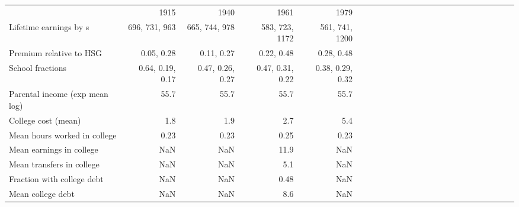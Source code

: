 \begin{tabular}{lrrrrrrrrrrrrrrrrrrrrrrr}
\hline
 & 1915  & 1940  & 1961  & 1979  &   &   &   &   &   &   &   &   &   &   &   &   &   &   &   &   &   &   &   \\
Lifetime earnings by s & 696, 731, 963  & 665, 744, 978  & 583, 723, 1172  & 561, 741, 1200  &   &   &   &   &   &   &   &   &   &   &   &   &   &   &   &   &   &   &   \\
Premium relative to HSG & 0.05, 0.28  & 0.11, 0.27  & 0.22, 0.48  & 0.28, 0.48  &   &   &   &   &   &   &   &   &   &   &   &   &   &   &   &   &   &   &   \\
School fractions & 0.64, 0.19, 0.17  & 0.47, 0.26, 0.27  & 0.47, 0.31, 0.22  & 0.38, 0.29, 0.32  &   &   &   &   &   &   &   &   &   &   &   &   &   &   &   &   &   &   &   \\
Parental income (exp mean log) & 55.7  & 55.7  & 55.7  & 55.7  &   &   &   &   &   &   &   &   &   &   &   &   &   &   &   &   &   &   &   \\
College cost (mean) & 1.8  & 1.9  & 2.7  & 5.4  &   &   &   &   &   &   &   &   &   &   &   &   &   &   &   &   &   &   &   \\
Mean hours worked in college & 0.23  & 0.23  & 0.25  & 0.23  &   &   &   &   &   &   &   &   &   &   &   &   &   &   &   &   &   &   &   \\
Mean earnings in college & NaN  & NaN  & 11.9  & NaN  &   &   &   &   &   &   &   &   &   &   &   &   &   &   &   &   &   &   &   \\
Mean transfers in college & NaN  & NaN  & 5.1  & NaN  &   &   &   &   &   &   &   &   &   &   &   &   &   &   &   &   &   &   &   \\
Fraction with college debt & NaN  & NaN  & 0.48  & NaN  &   &   &   &   &   &   &   &   &   &   &   &   &   &   &   &   &   &   &   \\
Mean college debt & NaN  & NaN  & 8.6  & NaN  &   &   &   &   &   &   &   &   &   &   &   &   &   &   &   &   &   &   &   \\
\hline
\end{tabular}%

